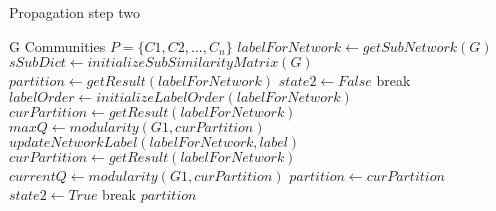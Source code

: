 \documentclass[11pt, twoside, a4paper]{article}
\begin{document}
        \renewcommand{\algorithmicrequire}{\textbf{Input:}}
        \renewcommand{\algorithmicensure}{\textbf{Output:}}
    \begin{algorithm}[h]
        \renewcommand{\thealgorithm}{2-3}
        \caption{Propagation step two}
        \begin{algorithmic}[1]
            \Require
            G
            \Ensure
            Communities $P = \{C1, C2, ..., C_n\}$
            \State $labelForNetwork \gets getSubNetwork(G)$
            \State $sSubDict \gets initializeSubSimilarityMatrix(G) $
            \State $partition \gets getResult(labelForNetwork) $
            \State $state2 \gets False $
            \State break
            \EndIf
            \State $labelOrder \gets initializeLabelOrder(labelForNetwork) $
            \State $curPartition \gets getResult(labelForNetwork) $
            \State $maxQ \gets modularity(G1, curPartition) $
            \State $updateNetworkLabel(labelForNetwork, label) $
            \EndFor
            \State $curPartition \gets getResult(labelForNetwork)$
            \State $currentQ \gets modularity(G1, curPartition) $
            \State $partition \gets curPartition $
            \EndIf
            \State $state2 \gets True $
            \State break
            \EndIf
            \EndWhile
            \State \Return $partition$
        \end{algorithmic}
    \end{algorithm}
\end{document}
